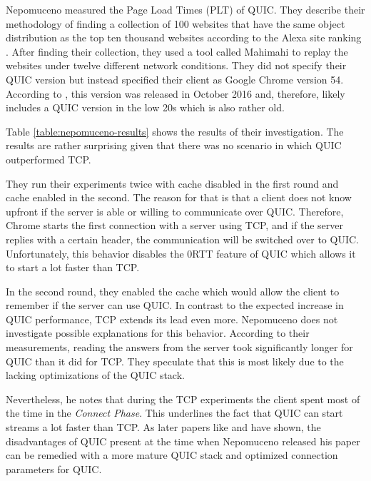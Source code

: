 \documentclass[conference]{IEEEtran}
\begin{document}
Nepomuceno measured the Page Load Times (PLT) of QUIC. They describe their methodology of finding a collection of 100 websites that have the same object distribution as the top ten thousand websites according to the Alexa site ranking \cite{AlexaRanking}. After finding their collection, they used a tool called Mahimahi to replay the websites under twelve different network conditions. They did not specify their QUIC version but instead specified their client as Google Chrome version 54. According to \cite{ChromeVersionHistory}, this version was released in October 2016 and, therefore, likely includes a QUIC version in the low 20s which is also rather old.

Table \ref{table:nepomuceno-results} shows the results of their investigation. The results are rather surprising given that there was no scenario in which QUIC outperformed TCP. 

They run their experiments twice with cache disabled in the first round and cache enabled in the second. The reason for that is that a client does not know upfront if the server is able or willing to communicate over QUIC. Therefore, Chrome starts the first connection with a server using TCP, and if the server replies with a certain header, the communication will be switched over to QUIC. Unfortunately, this behavior disables the 0RTT feature of QUIC which allows it to start a lot faster than TCP.

In the second round, they enabled the cache which would allow the client to remember if the server can use QUIC. In contrast to the expected increase in QUIC performance, TCP extends its lead even more. Nepomuceno does not investigate possible explanations for this behavior. According to their measurements, reading the answers from the server took significantly longer for QUIC than it did for TCP. They speculate that this is most likely due to the lacking optimizations of the QUIC stack.

Nevertheless, he notes that during the TCP experiments the client spent most of the time in the \textit{Connect Phase}. This underlines the fact that QUIC can start streams a lot faster than TCP. As later papers like \cite{Kakhki} and \cite{Kernel} have shown, the disadvantages of QUIC present at the time when Nepomuceno released his paper can be remedied with a more mature QUIC stack and optimized connection parameters for QUIC.
\end{document}
